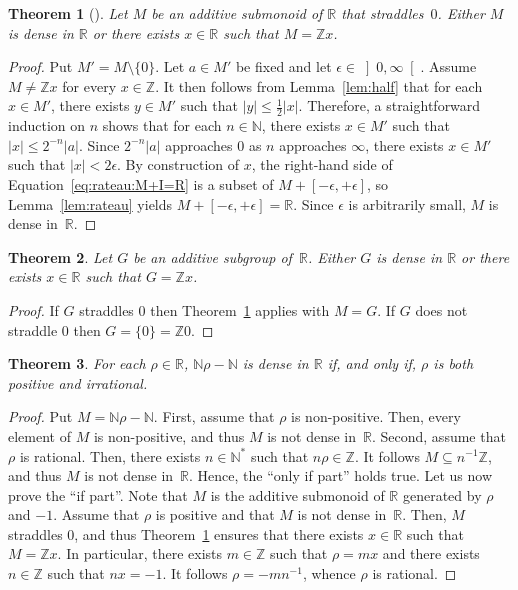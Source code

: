 \documentclass[12pt]{article}
\newcommand{\bZ}{\mathbb{Z}}
\newcommand{\bN}{\mathbb{N}} %
\newcommand{\bNast}{\bN^*} %
\newcommand{\bR}{\mathbb{R}}
\newcommand{\Rpos}{\left]0, \infty\right[} %
\newcommand{\abs}[1]{\left| #1 \right|}
\newcommand{\thalf}{\tfrac{1}{2}}
\newtheorem{theorem}{Theorem}
\theoremstyle{definition}
\begin{document}
\begin{theorem}[\cite{AbelsManoussos2012}] \label{thm:additive-submonoid-R}
  Let $M$ be an additive submonoid of $\bR$ that straddles~$0$.
  Either $M$ is dense in $\bR$ or there exists $x \in \bR$ such that $M = \bZ x$.
\end{theorem}

\begin{proof}
  Put $M' = M \setminus \{ 0 \}$.
  Let $a \in M'$ be fixed and let $\epsilon \in \Rpos$.
  Assume $M \ne \bZ x$ for every $x \in \bZ$.
  It then follows from Lemma~\ref{lem:half} that for each $x \in M'$,
  there exists $y \in M'$ such that $\abs{y} \le \thalf \abs{x}$.
  Therefore, a straightforward induction on $n$ shows that for each $n \in \bN$,
  there exists $x \in M'$ such that $\abs{x} \le 2^{- n} \abs{a}$.
  Since $2^{-n} \abs{a}$ approaches $0$ as $n$ approaches $\infty$,
  there exists $x \in M'$ such that $\abs{x} < 2 \epsilon$.
  By construction of $x$,
  the right-hand side of Equation~\eqref{eq:rateau:M+I=R} is a subset of $M + [- \epsilon, + \epsilon]$,
  so Lemma~\ref{lem:rateau} yields $M + [- \epsilon, + \epsilon] = \bR$.
  Since $\epsilon$ is arbitrarily small, $M$ is dense in~$\bR$.
\end{proof}


\begin{theorem} \label{thm:additive-subgroup-R}
  Let $G$ be an additive subgroup of~$\bR$.
  Either $G$ is dense in $\bR$ or there exists $x \in \bR$ such that $G = \bZ x$.
\end{theorem}


\begin{proof}
  If $G$ straddles $0$ then Theorem~\ref{thm:additive-submonoid-R} applies with $M = G$.
  If $G$ does not straddle $0$ then $G = \{ 0 \} = \bZ 0$.
\end{proof}

  

 \begin{theorem} \label{thm:Nr-N}
   For each $\rho \in \bR$,
    $\bN \rho - \bN$ is dense in $\bR$ if, and only if,  $\rho$ is both positive and irrational.
\end{theorem}

\begin{proof}
  Put $M = \bN \rho - \bN$.
  First, assume that $\rho$ is non-positive.
  Then, every element of $M$ is non-positive, and thus $M$ is not dense in~$\bR$.
  Second, assume that $\rho$ is rational.
  Then, there exists $n \in \bNast$ such that $n \rho \in \bZ$.
  It follows $M \subseteq n^{-1} \bZ$, and thus $M$ is not dense in~$\bR$.
  Hence, the ``only if part'' holds true.
  Let us now prove the ``if part''.
  Note that $M$ is the additive submonoid of $\bR$ generated by $\rho$ and $- 1$.
  Assume that $\rho$ is positive and that $M$ is not dense in~$\bR$.
  Then, $M$ straddles $0$,
  and thus Theorem~\ref{thm:additive-submonoid-R} ensures that there exists $x \in \bR$ such that $M = \bZ x$.
  In particular, there exists $m \in \bZ$ such that $\rho = m x$ and there exists $n \in \bZ$ such that $n x = - 1$.
  It follows $\rho = - m n^{-1}$, whence $\rho$ is rational.
\end{proof}
\end{document}
